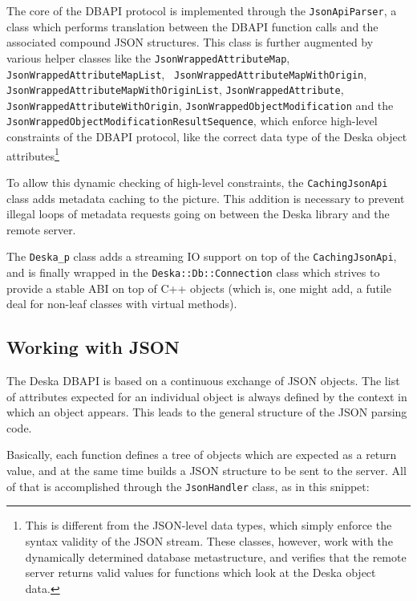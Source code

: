 \documentclass[deska]{subfiles}
\begin{document}
The core of the DBAPI protocol is implemented through the {\tt JsonApiParser}, a class which performs translation
between the DBAPI function calls and the associated compound JSON structures.  This class is further augmented by
various helper classes like the {\tt JsonWrappedAttributeMap}, {\tt JsonWrappedAttributeMapList}, {\tt
JsonWrappedAttributeMapWithOrigin}, {\tt JsonWrappedAttributeMapWithOriginList}, {\tt JsonWrappedAttribute}, {\tt
JsonWrappedAttributeWithOrigin}, {\tt JsonWrappedObjectModification} and the {\tt
JsonWrappedObjectModificationResultSequence}, which enforce high-level constraints of the DBAPI protocol, like the
correct data type of the Deska object attributes\footnote{This is different from the JSON-level data types, which simply
enforce the syntax validity of the JSON stream.  These classes, however, work with the dynamically determined database
metastructure, and verifies that the remote server returns valid values for functions which look at the Deska object
data.}

To allow this dynamic checking of high-level constraints, the {\tt CachingJsonApi} class adds metadata caching to the
picture.  This addition is necessary to prevent illegal loops of metadata requests going on between the Deska library
and the remote server.

The {\tt Deska\_p} class adds a streaming IO support on top of the {\tt CachingJsonApi}, and is finally wrapped in the
{\tt Deska::Db::Connection} class which strives to provide a stable ABI on top of C++ objects (which is, one might add,
a futile deal for non-leaf classes with virtual methods).

\subsection{Working with JSON}

The Deska DBAPI is based on a continuous exchange of JSON objects.  The list of attributes expected for an individual
object is always defined by the context in which an object appears.  This leads to the general structure of the JSON
parsing code.

Basically, each function defines a tree of objects which are expected as a return value, and at the same time builds a
JSON structure to be sent to the server.  All of that is accomplished through the {\tt JsonHandler} class, as in this
snippet:
\end{document}
